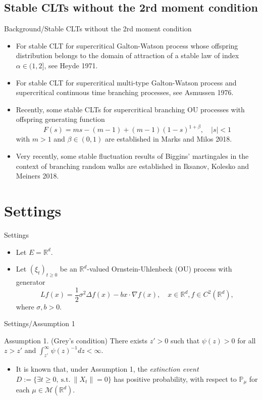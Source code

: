 \documentclass[xcolor=dvipsnames]{beamer}
\begin{document}
\subsection{Stable CLTs without the 2rd moment condition}
\begin{frame}{Background/Stable CLTs without the 2rd moment condition}
\begin{itemize}
\item
	For stable CLT for supercritical {\color{red} Galton-Watson process} whose {\color{red} offspring distribution
    belongs to the domain of attraction of a stable law of index $\alpha\in (1, 2]$}, see Heyde 1971.
\item
	For stable CLT for supercritical {\color{red} multi-type Galton-Watson process} and supercritical {\color{red} continuous time branching processes}, see Asmussen 1976.
\item
	Recently, some stable CLTs for supercritical {\color{red} branching OU processes} with offspring generating function
\[
    F(s)
    = ms -(m-1) +(m-1) (1-s)^{1+\beta},
    \quad |s|< 1
\]
	with $m>1$ and $\beta\in (0, 1)$ are established in Marks and Milos 2018.
\item
	Very recently, some stable fluctuation results of Biggins’ martingales in the context of {\color{red} branching random walks} are established in Iksanov, Kolesko and Meiners 2018.
\end{itemize}
\end{frame}


\section{Settings}
\begin{frame}{Settings}
\begin{itemize}
\item
	Let $E= \mathbb R^d$.
\item
	Let $(\xi_t)_{t\geq 0}$ be an $\mathbb R^d$-valued Ornstein-Uhlenbeck (OU) process with generator
\[
	Lf(x)
	=\frac{1}{2} \sigma^2 \Delta f(x)-bx\cdot\nabla f(x),
	\quad x\in \mathbb R^d, f\in C^2(\mathbb R^d),
\]
	where $\sigma,b>0$.
\end{itemize}
\end{frame}

\begin{frame}{Settings/Assumption 1}

\begin{block}{Assumption 1. (Grey's condition)}
	There exists $z' > 0$ such that $\psi(z) > 0$ for all $z>z'$ and  $\int_{z'}^\infty \psi(z)^{-1}dz < \infty$.
\end{block}
\begin{itemize}
\item
	It is known  that, under Assumption 1, 
	the \emph{extinction event} 
	$D:=\{\exists t\geq 0,~\text{s.t.}~\|X_t\|=0\}$ has positive probability, with respect to $\mathbb P_\mu$ for each  $\mu \in \mathcal M(\mathbb R^d)$.
\end{itemize}
\end{frame}
\end{document}
